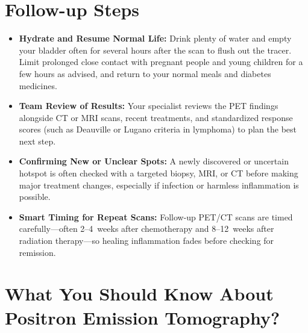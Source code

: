 \section{Follow-up Steps}

\begin{itemize}
    \item \textbf{Hydrate and Resume Normal Life:} Drink plenty of water and empty your bladder often for several hours after the scan to flush out the tracer. Limit prolonged close contact with pregnant people and young children for a few hours as advised, and return to your normal meals and diabetes medicines.
    \item \textbf{Team Review of Results:} Your specialist reviews the PET findings alongside CT or MRI scans, recent treatments, and standardized response scores (such as Deauville or Lugano criteria in lymphoma) to plan the best next step.
    \item \textbf{Confirming New or Unclear Spots:} A newly discovered or uncertain hotspot is often checked with a targeted biopsy, MRI, or CT before making major treatment changes, especially if infection or harmless inflammation is possible.
    \item \textbf{Smart Timing for Repeat Scans:} Follow-up PET/CT scans are timed carefully---often 2--4~weeks after chemotherapy and 8--12~weeks after radiation therapy---so healing inflammation fades before checking for remission.
\end{itemize}

\section{What You Should Know About Positron Emission Tomography?}

